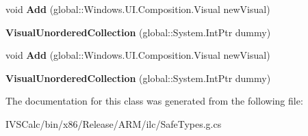 \begin{DoxyCompactItemize}
void {\bfseries Add} (global\+::\+Windows.\+U\+I.\+Composition.\+Visual new\+Visual)
\item 
\mbox{\label{class_windows_1_1_u_i_1_1_composition_1_1_visual_unordered_collection_a39d7407ca3ced45df7eba8a5ef26f207}} 
{\bfseries Visual\+Unordered\+Collection} (global\+::\+System.\+Int\+Ptr dummy)
\item 
\mbox{\label{class_windows_1_1_u_i_1_1_composition_1_1_visual_unordered_collection_aa664a9104e056d4cc220e9d2fe58583e}} 
void {\bfseries Add} (global\+::\+Windows.\+U\+I.\+Composition.\+Visual new\+Visual)
\item 
\mbox{\label{class_windows_1_1_u_i_1_1_composition_1_1_visual_unordered_collection_a39d7407ca3ced45df7eba8a5ef26f207}} 
{\bfseries Visual\+Unordered\+Collection} (global\+::\+System.\+Int\+Ptr dummy)
\end{DoxyCompactItemize}


The documentation for this class was generated from the following file\+:\begin{DoxyCompactItemize}
\item 
I\+V\+S\+Calc/bin/x86/\+Release/\+A\+R\+M/ilc/Safe\+Types.\+g.\+cs\end{DoxyCompactItemize}
